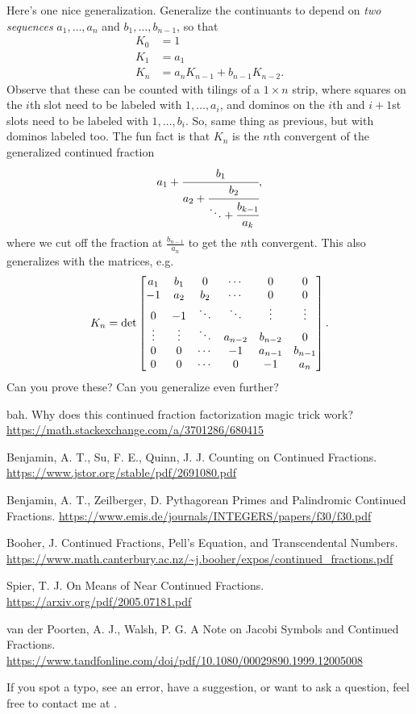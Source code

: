 \documentclass[11pt,paper=letter]{scrartcl}
\begin{document}
Here's one nice generalization. Generalize the continuants to depend on \emph{two sequences} $a_1, \ldots, a_n$ and $b_1, \ldots, b_{n-1}$, so that
\begin{align*}
K_0 &= 1 \\
K_1 &= a_1 \\
K_n &= a_n K_{n-1} + b_{n-1} K_{n-2}.
\end{align*}
Observe that these can be counted with tilings of a $1 \times n$ strip, where squares on the $i$th slot need to be labeled with $1, \ldots, a_i$, and dominos on the $i$th and $i+1$st slots need to be labeled with $1, \ldots, b_i$. So, same thing as previous, but with dominos labeled too. The fun fact is that $K_n$ is the $n$th convergent of the generalized continued fraction \[
  a_1 + \cfrac{b_1}{
    a_2 + \cfrac{b_2}{
      \ddots + \cfrac{b_{k-1}}{a_k}
    }
  },
\]
where we cut off the fraction at $\frac{b_{n-1}}{a_n}$ to get the $n$th convergent. This also generalizes with the matrices, e.g. \[
  K_n
  = \det\begin{bmatrix}
  a_1 & b_1 & 0 & \cdots & 0 & 0 \\
  -1 & a_2 & b_2 & \cdots & 0 & 0 \\
  0 & -1 & \ddots& \ddots & \vdots & \vdots \\
  \vdots & \vdots & \ddots & a_{n-2} & b_{n-2} & 0 \\
  0 & 0 & \cdots & -1 & a_{n-1} & b_{n-1} \\
  0 & 0 & \cdots & 0 & -1 & a_n
  \end{bmatrix}.
\]
Can you prove these? Can you generalize even further?

\begin{thebibliography}{99}
   bah. Why does this continued fraction factorization magic trick work? \url{https://math.stackexchange.com/a/3701286/680415}

   Benjamin, A. T., Su, F. E., Quinn, J. J. Counting on Continued Fractions. \url{https://www.jstor.org/stable/pdf/2691080.pdf}

   Benjamin, A. T., Zeilberger, D. Pythagorean Primes and Palindromic Continued Fractions. \url{https://www.emis.de/journals/INTEGERS/papers/f30/f30.pdf}

   Booher, J. Continued Fractions, Pell's Equation, and Transcendental Numbers. \url{https://www.math.canterbury.ac.nz/~j.booher/expos/continued_fractions.pdf}

   Spier, T. J. On Means of Near Continued Fractions. \url{https://arxiv.org/pdf/2005.07181.pdf}

   van der Poorten, A. J., Walsh, P. G. A Note on Jacobi Symbols and Continued Fractions. \url{https://www.tandfonline.com/doi/pdf/10.1080/00029890.1999.12005008}
\end{thebibliography}

If you spot a typo, see an error, have a suggestion, or want to ask a question, feel free to contact me at .
\end{document}
